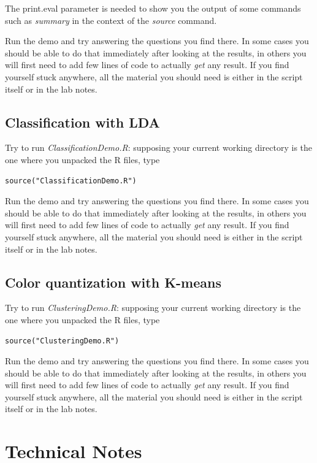 \documentclass[a4paper,12pt,titlepage]{article} %
\begin{document}
The print.eval parameter is needed to show you the output of some commands such as \textit{summary} in the context of the \textit{source} command.

Run the demo and try answering the questions you find there. In some cases you should be able to do that immediately after looking at the results, in others you will first need to add few lines of code to actually \textit{get} any result. If you find yourself stuck anywhere, all the material you should need is either in the script itself or in the lab notes.

\newpage
\subsection{Classification with LDA}
Try to run \textit{ClassificationDemo.R}: supposing your current working directory is the one where you unpacked the R files, type
\begin{verbatim}
source("ClassificationDemo.R")
\end{verbatim}

Run the demo and try answering the questions you find there. In some cases you should be able to do that immediately after looking at the results, in others you will first need to add few lines of code to actually \textit{get} any result. If you find yourself stuck anywhere, all the material you should need is either in the script itself or in the lab notes.

\newpage
\subsection{Color quantization with K-means}
Try to run \textit{ClusteringDemo.R}: supposing your current working directory is the one where you unpacked the R files, type
\begin{verbatim}
source("ClusteringDemo.R")
\end{verbatim}

Run the demo and try answering the questions you find there. In some cases you should be able to do that immediately after looking at the results, in others you will first need to add few lines of code to actually \textit{get} any result. If you find yourself stuck anywhere, all the material you should need is either in the script itself or in the lab notes.

\newpage
\section{Technical Notes}
\end{document}
